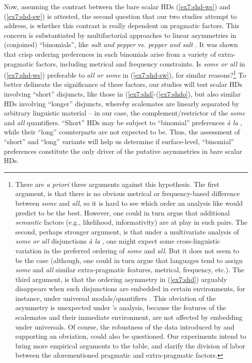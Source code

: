 Now, assuming the contrast between the bare scalar HDs (\ref{ex7:shd-ws}) and (\ref{ex7:shd-sw}) is attested, the second question that our two studies attempt to address, is whether this contrast is really dependent on pragmatic factors. This concern is substantiated by multifactorial approaches to linear asymmetries in (conjoined) ``binomials'', like \textit{salt and pepper} vs. \textit{pepper and salt} \parencite{Benor2006}. It was shown that crisp ordering preferences in such binomials arise from a variety of extra-pragmatic factors, including metrical and frequency constraints. Is \textit{some or all} in (\ref{ex7:shd-ws}) preferable to \textit{all or some} in (\ref{ex7:shd-sw}), for similar reasons?\footnote{There are \textit{a priori} three arguments against this hypothesis. The first argument, is that there is no obvious metrical or frequency-based difference between \textit{some} and \textit{all}, so it is hard to see which order an analysis like \textcite{Benor2006} would predict to be the best. However, one could in turn argue that additional \textit{semantic} factors (e.g., likelihood, informativity) are at play in such pairs. The second, perhaps stronger argument, is that under a multivariate analysis of \textit{some or all} disjunctions \textit{à la} \textcite{Benor2006}, one might expect some cross-linguistic variation in the preferred ordering of \textit{some} and \textit{all}. But it does not seem to be the case (although, one could in turn argue that languages tend to assign \textit{some} and \textit{all} similar extra-pragmatic features, metrical, frequency, etc.). The third argument, is that the ordering asymmetry in (\ref{ex7:shd}) arguably disappears when such disjunctions are embedded in certain environments, for instance, under universal modals/quantifiers \parencite{Fox2018a}. This obviation of the asymmetry is unexpected under \textcite{Benor2006}'s analysis, because the features of the scalemates and their immediate environment, are not affected by embedding under universals. Of course, the robustness of the data introduced by \textcite{Fox2018a} and supporting an obviation, could also be questioned. Our experiments intend to bring more empirical arguments to the table, and clarify the division of labor between the aforementioned pragmatic and extra-pragmatic factors.} To better delineate the significance of these factors, our studies will test scalar HDs involving ``short'' disjuncts, like those in (\ref{ex7:shd}-(\ref{ex7:shdo}), but also similar HDs involving ``longer'' disjuncts, whereby scalemates are linearly separated by arbitrary linguistic material -- in our case, the complement/restrictor of the \textit{some} and \textit{all} quantifiers. ``Short'' HDs may be subject to ``binomial'' preferences \textit{à la} \textcite{Benor2006}, while their ``long'' counterparts are not expected to be. Thus, the assessment of ``short'' and ``long'' variants will help us determine if surface-level, ``binomial'' preferences constitute the only driver of the putative asymmetries in bare scalar HDs.

